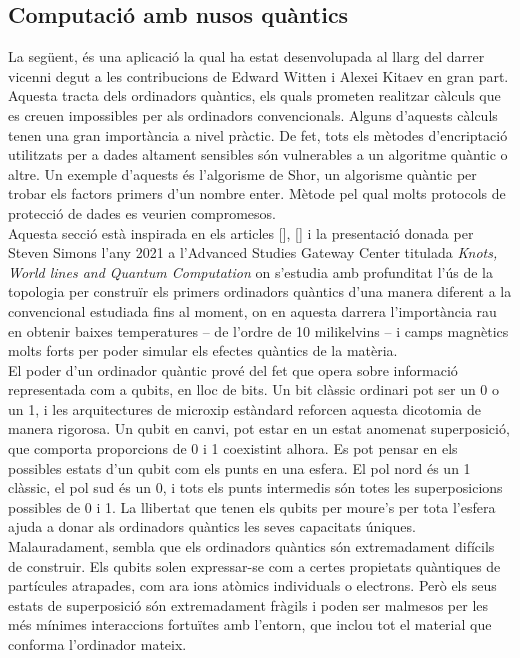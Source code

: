 \subsection{Computació amb nusos quàntics}\label{sec:nusosquantics}

La següent, és una aplicació la qual ha estat desenvolupada al llarg del darrer vicenni degut a les contribucions de Edward Witten i Alexei Kitaev en gran part. Aquesta tracta dels ordinadors quàntics, els quals prometen realitzar càlculs que es creuen impossibles per als ordinadors convencionals. Alguns d’aquests càlculs tenen una gran importància a nivel pràctic. De fet, tots els mètodes d’encriptació utilitzats per a dades altament sensibles són vulnerables a un algoritme quàntic o altre. Un exemple d'aquests és l'algorisme de Shor, un algorisme quàntic per trobar els factors primers d'un nombre enter. Mètode pel qual molts protocols de protecció de dades es veurien compromesos.\\

Aquesta secció està inspirada en els articles [\cite{computingwithquantumknots}], [\cite{braidtopologiesforquantumcomputation}] i la presentació donada per Steven Simons l'any 2021 a l'Advanced Studies Gateway Center titulada \textit{Knots, World lines and Quantum Computation} on s'estudia amb profunditat l'ús de la topologia per construïr els primers ordinadors quàntics d'una manera diferent a la convencional estudiada fins al moment, on en aquesta darrera l'importància rau en obtenir baixes temperatures -- de l'ordre de 10 milikelvins -- i camps magnètics molts forts per poder simular els efectes quàntics de la matèria.\\

El poder d’un ordinador quàntic prové del fet que opera sobre informació representada com a qubits, en lloc de bits. Un bit clàssic ordinari pot ser un 0 o un 1, i les arquitectures de microxip estàndard reforcen aquesta dicotomia de manera rigorosa. Un qubit en canvi, pot estar en un estat anomenat superposició, que comporta proporcions de 0 i 1 coexistint alhora. Es pot pensar en els possibles estats d'un qubit com els punts en una esfera. El pol nord és un 1 clàssic, el pol sud és un 0, i tots els punts intermedis són totes les superposicions possibles de 0 i 1. La llibertat que tenen els qubits per moure’s per tota l’esfera ajuda a donar als ordinadors quàntics les seves capacitats úniques.\\

Malauradament, sembla que els ordinadors quàntics són extremadament difícils de construir. Els qubits solen expressar-se com a certes propietats quàntiques de partícules atrapades, com ara ions atòmics individuals o electrons. Però els seus estats de superposició són extremadament fràgils i poden ser malmesos per les més mínimes interaccions fortuïtes amb l’entorn, que inclou tot el material que conforma l’ordinador mateix.\\


